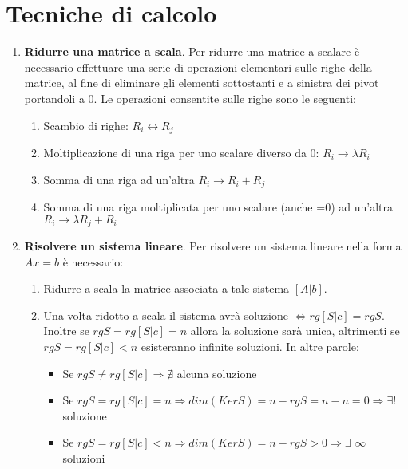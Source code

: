 \documentclass[12pt,a4paper,oneside]{book}
\begin{document}
	
\newpage
			  \section{Tecniche di calcolo}
			  
\begin{enumerate}

\item \textbf{Ridurre una matrice a scala}. \linebreak
	  Per ridurre una matrice a scalare è necessario effettuare una serie di operazioni elementari sulle 
	  righe della matrice, al fine di eliminare gli elementi sottostanti e a sinistra dei pivot portandoli 
	  a 0. Le operazioni consentite sulle righe sono le seguenti:
	  
	  \begin{enumerate}
	  \item Scambio di righe: $R_i \leftrightarrow R_j$
	  \item Moltiplicazione di una riga per uno scalare diverso da 0: $R_i \rightarrow \lambda R_i$
	  \item Somma di una riga ad un'altra $R_i \rightarrow R_i+R_j$
	  \item Somma di una riga moltiplicata per uno scalare (anche =0) ad un'altra $R_i \rightarrow \lambda 
	  		R_j + R_i$
	  \end{enumerate}
	
\item \textbf{Risolvere un sistema lineare}. \linebreak
	  Per risolvere un sistema lineare nella forma $Ax=b$ è necessario:
	  \begin{enumerate}
	  \item Ridurre a scala la matrice associata a tale sistema $[A|b]$.
	  \item Una volta ridotto a scala il sistema avrà soluzione $\Leftrightarrow rg[S|c] = rgS$. \hfill
	        \break Inoltre se $rgS=rg[S|c]=n$ allora la soluzione sarà unica, altrimenti se $rgS=rg[S|c]<n$
	        esisteranno infinite soluzioni. In altre parole:
	        
	        \begin{itemize}
	  		\item Se $rgS \neq rg[S|c] \Rightarrow \nexists $ alcuna soluzione
	  		\item Se $rgS=rg[S|c]=n \Rightarrow dim(KerS) = n-rgS = n-n = 0 \Rightarrow \exists $! 
	  			  soluzione	
	  		\item Se $rgS=rg[S|c]<n \Rightarrow dim(KerS) = n-rgS > 0 \Rightarrow \exists$ $\infty$ 
	  		      soluzioni
			\end{itemize}
			

\end{enumerate}
\end{enumerate}
\end{document}
